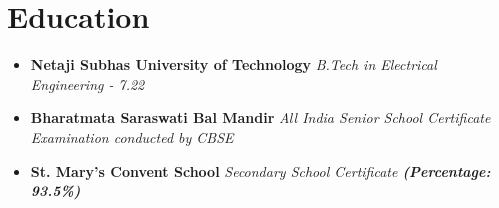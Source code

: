 \documentclass[letterpaper,11pt]{article}
\begin{document}
    

\vspace{-19pt}

\section{Education}
    \begin{itemize}[leftmargin=0.15in] 
        \item {\textbf{Netaji Subhas University of Technology}\hspace{9.5cm}{Delhi, India}
        \textit{{B.Tech in Electrical Engineering - 7.22}\hspace{9.7cm}{July '21 - May '25}}}
        \vspace{-5pt}
        \item {\textbf{Bharatmata Saraswati Bal Mandir}\hspace{10.5cm}{Delhi, India}
        \textit{{All India Senior School Certificate Examination conducted by CBSE
        }\hspace{5cm}{Apr '19 - Mar '21}}}
        \vspace{-5pt}
        \item {\textbf{St. Mary's Convent School}\hspace{11cm}{Ghaziabad, India}
        \textit{{Secondary School Certificate \textbf{(Percentage: 93.5\%)}}\hspace{7.5cm}{Apr '07 - Mar '19}}}
    \end{itemize}

\vspace{-19pt}
\end{document}

